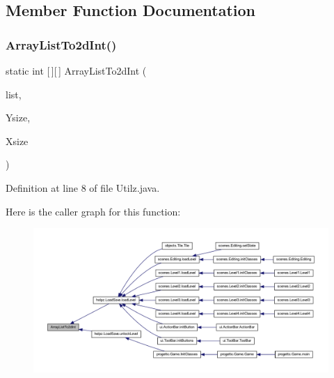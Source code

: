 \subsection{Member Function Documentation}
\mbox{\label{classhelpz_1_1_utilz_a3f701300276e5102efe8c55e65192dec}} 
\subsubsection{\texorpdfstring{Array\+List\+To2d\+Int()}{ArrayListTo2dInt()}}
{\footnotesize\ttfamily static int \mbox{[}$\,$\mbox{]}\mbox{[}$\,$\mbox{]} Array\+List\+To2d\+Int (\begin{DoxyParamCaption}\item[{Array\+List$<$ Integer $>$}]{list,  }\item[{int}]{Ysize,  }\item[{int}]{Xsize }\end{DoxyParamCaption})\hspace{0.3cm}{\ttfamily [static]}}



Definition at line 8 of file Utilz.\+java.

Here is the caller graph for this function\+:
\nopagebreak
\begin{figure}[H]
\begin{center}
\leavevmode
\includegraphics[width=350pt]{classhelpz_1_1_utilz_a3f701300276e5102efe8c55e65192dec_icgraph}
\end{center}
\end{figure}
\mbox{\label{classhelpz_1_1_utilz_a8a4c702547acd44cb113b787ae1d3e05}} 
